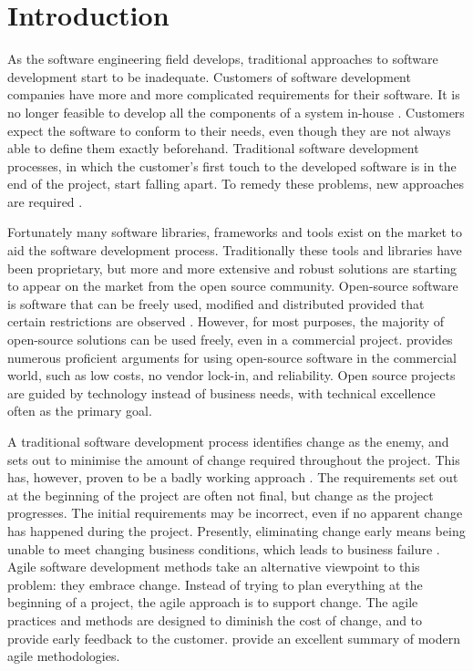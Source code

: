 \chapter{Introduction}
\label{toc:intro}

As the software engineering field develops, traditional approaches to 
software development start to be inadequate. Customers of software 
development companies have more and more complicated requirements for 
their software. It is no longer feasible to develop all the components 
of a system in-house \citep{usingj2ee}. Customers expect the software 
to conform to their needs, even though they are not always able to 
define them exactly beforehand. Traditional software development 
processes, in which the customer's first touch to the developed 
software is in the end of the project, start falling apart. To remedy 
these problems, new approaches are required \citep{agileinnovation}.

Fortunately many software libraries, frameworks and tools exist on the 
market to aid the software development process. Traditionally these 
tools and libraries have been proprietary, but more and more extensive 
and robust solutions are starting to appear on the market from the 
open source community. Open-source software is software that can be 
freely used, modified and distributed provided that certain 
restrictions are observed \citep{usingoss}. However, for most 
purposes, the majority of open-source solutions can be used freely, 
even in a commercial project. \cite{ossolutions} provides numerous 
proficient arguments for using open-source software in the commercial 
world, such as low costs, no vendor lock-in, and reliability. Open 
source projects are guided by technology instead of business needs, 
with technical excellence often as the primary goal.

A traditional software development process identifies change as the 
enemy, and sets out to minimise the amount of change required 
throughout the project. This has, however, proven to be a badly 
working approach \citep{agileinnovation}. The requirements set out at 
the beginning of the project are often not final, but change as the 
project progresses. The initial requirements may be incorrect, even if 
no apparent change has happened during the project. Presently, 
eliminating change early means being unable to meet changing business 
conditions, which leads to business failure \citep{agileinnovation}. 
Agile software development methods take an alternative viewpoint to 
this problem: they embrace change. Instead of trying to plan 
everything at the beginning of a project, the agile approach is to 
support change. The agile practices and methods are designed to 
diminish the cost of change, and to provide early feedback to the 
customer. \cite{agilesdm} provide an excellent summary of modern agile 
methodologies.


